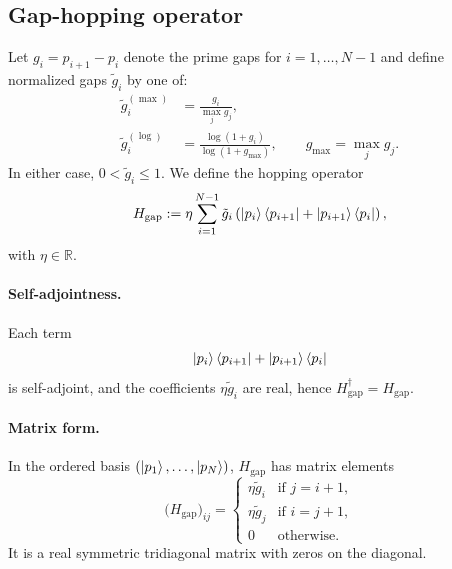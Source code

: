 \documentclass[11pt]{article}
\begin{document}
\subsection{Gap-hopping operator}

Let $g_i = p_{i+1}-p_i$ denote the prime gaps for $i=1,\dots,N-1$ and define normalized gaps $\tilde g_i$ by one of:
\begin{align}
\tilde g_i^{(\max)} &= \frac{g_i}{\max_j g_j},\\
\tilde g_i^{(\log)} &= \frac{\log(1+g_i)}{\log(1+g_{\max})},\qquad g_{\max} = \max_j g_j.
\end{align}
In either case, $0<\tilde g_i\leq 1$. We define the hopping operator
\begin{equation}
H_{\mathrm{gap}} := \eta\sum_{i=1}^{N-1}\tilde g_i\left(\ket{p_i}\bra{p_{i+1}} + \ket{p_{i+1}}\bra{p_i}\right),
\end{equation}
with $\eta\in\mathbb{R}$.

\paragraph{Self-adjointness.}
Each term
\[
\ket{p_i}\bra{p_{i+1}} + \ket{p_{i+1}}\bra{p_i}
\]
is self-adjoint, and the coefficients $\eta\tilde g_i$ are real, hence $H_{\mathrm{gap}}^\dagger = H_{\mathrm{gap}}$.

\paragraph{Matrix form.}
In the ordered basis $(\ket{p_1},\dots,\ket{p_N})$, $H_{\mathrm{gap}}$ has matrix elements
\[
\big(H_{\mathrm{gap}}\big)_{ij} =
\begin{cases}
\eta \tilde g_i & \text{if } j=i+1,\\
\eta \tilde g_{j} & \text{if } i=j+1,\\
0 & \text{otherwise}.
\end{cases}
\]
It is a real symmetric tridiagonal matrix with zeros on the diagonal.
\end{document}
